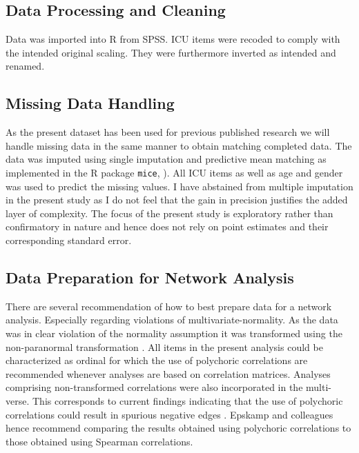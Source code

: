 \documentclass[a4paper,12pt]{article} %
\begin{document}
\subsection{Data Processing and Cleaning}
Data was imported into R from SPSS. 
ICU items were recoded to comply with the intended original scaling.
They were furthermore inverted as intended and renamed. 

\subsection{Missing Data Handling}
As the present dataset has been used for previous published research we will handle missing data in the same manner to obtain matching completed data.
The data was imputed using single imputation and predictive mean matching as implemented in the R package \texttt{mice}, ).
All ICU items as well as age and gender was used to predict the missing values.
I have abstained from multiple imputation in the present study as I do not feel that the gain in precision justifies the added layer of complexity.
The focus of the present study is exploratory rather than confirmatory in nature and hence does not rely on point estimates and their corresponding standard error.

\subsection{Data Preparation for Network Analysis}
There are several recommendation of how to best prepare data for a network analysis. 
Especially regarding violations of multivariate-normality.
As the data was in clear violation of the normality assumption it was transformed using the non-paranormal transformation \parencite{liu_nonparanormal_2009}.
All items in the present analysis could be characterized as ordinal for which the use of polychoric correlations are recommended whenever analyses are based on correlation matrices.
Analyses comprising non-transformed correlations were also incorporated in the multi-verse. 
This corresponds to current findings indicating that the use of polychoric correlations could result in spurious negative edges \parencite{epskamp_estimating_2018}.
Epskamp and colleagues hence recommend comparing the results obtained using polychoric correlations to those obtained using Spearman correlations.  
\end{document}
